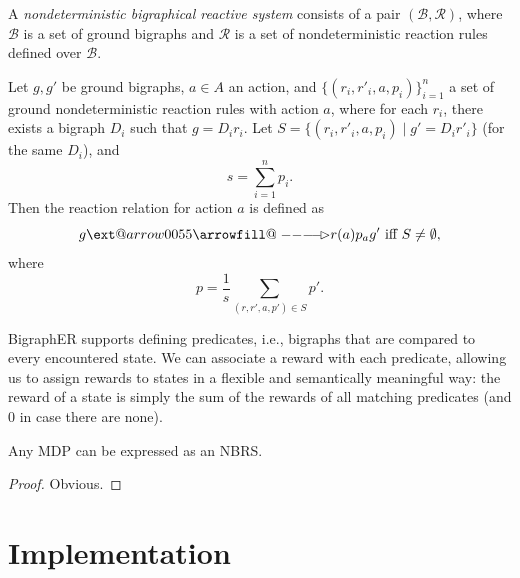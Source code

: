 \documentclass[runningheads]{llncs}
\makeatletter
\providecommand\longrightarrowrhd{\relbar\joinrel\relbar\joinrel\mathrel\rhd}
\providecommand*\xrightarrowrhd[2][]{\ext@arrow 0055{\arrowfill@\relbar\relbar\longrightarrowrhd}{#1}{#2}}
\makeatother
\begin{document}
\begin{definition}
  A \emph{nondeterministic bigraphical reactive system} consists of a pair
  $(\mathcal{B}, \mathcal{R})$, where $\mathcal{B}$ is a set of ground bigraphs
  and $\mathcal{R}$ is a set of nondeterministic reaction rules defined over
  $\mathcal{B}$.

  Let $g, g'$ be ground bigraphs, $a \in A$ an action, and $\{ (r_i, r'_i, a,
  p_i) \}_{i=1}^n$ a set of ground nondeterministic reaction rules with action
  $a$, where for each $r_i$, there exists a bigraph $D_i$ such that $g =
  D_ir_i$. Let $S = \{ (r_i, r'_i, a, p_i) \mid g' = D_ir'_i \}$ (for the same
  $D_i$), and
  \[ s = \sum_{i=1}^n p_i. \]
  Then the reaction relation for action $a$ is defined as
  \[ g \xrightarrowrhd[r(a)]{p}_{a} g' \text{ iff } S \ne \emptyset, \]
  where
  \[ p = \frac{1}{s}\sum_{(r, r', a, p') \in S} p'. \]
\end{definition}

BigraphER \cite{DBLP:conf/cav/SevegnaniC16} supports defining predicates, i.e.,
bigraphs that are compared to every encountered state. We can associate a reward
with each predicate, allowing us to assign rewards to states in a flexible and
semantically meaningful way: the reward of a state is simply the sum of the
rewards of all matching predicates (and $0$ in case there are none).

\begin{proposition}
  Any MDP can be expressed as an NBRS.
\end{proposition}
\begin{proof}
  Obvious.
\end{proof}

\section{Implementation}
\end{document}
